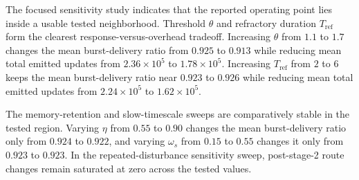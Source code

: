 \documentclass[5p,times]{elsarticle}
\begin{document}
The focused sensitivity study indicates that the reported operating point lies inside a usable tested neighborhood. Threshold $\theta$ and refractory duration $T_{\mathrm{ref}}$ form the clearest response-versus-overhead tradeoff. Increasing $\theta$ from $1.1$ to $1.7$ changes the mean burst-delivery ratio from $0.925$ to $0.913$ while reducing mean total emitted updates from $2.36\times 10^5$ to $1.78\times 10^5$. Increasing $T_{\mathrm{ref}}$ from $2$ to $6$ keeps the mean burst-delivery ratio near $0.923$ to $0.926$ while reducing mean total emitted updates from $2.24\times 10^5$ to $1.62\times 10^5$.

The memory-retention and slow-timescale sweeps are comparatively stable in the tested region. Varying $\eta$ from $0.55$ to $0.90$ changes the mean burst-delivery ratio only from $0.924$ to $0.922$, and varying $\omega_s$ from $0.15$ to $0.55$ changes it only from $0.923$ to $0.923$. In the repeated-disturbance sensitivity sweep, post-stage-2 route changes remain saturated at zero across the tested values.
\end{document}
